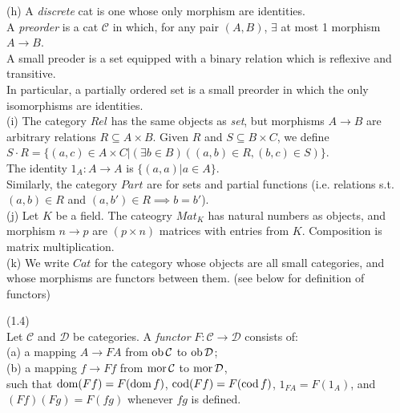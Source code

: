 \documentclass[a4paper]{article}
\begin{document}
\begin{eg}
    (h) A \emph{discrete} cat is one whose only morphism are identities.\\
    A \emph{preorder} is a cat $\mathcal{C}$ in which, for any pair $(A,B)$, $\exists$ at most 1 morphism $A \to B$.\\
    A small preoder is a set equipped with a binary relation which is reflexive and transitive.\\
    In particular, a partially ordered set is a small preorder in which the only isomorphisms are identities.\\
    (i) The category $Rel$ has the same objects as \emph{set}, but morphisms $A \to B$ are arbitrary relations $R \subseteq A \times B$. Given $R$ and $S \subseteq B\times C$, we define $S \cdot R = \{(a,c) \in A \times C | (\exists b \in B) ((a,b) \in R, (b,c) \in S)\}$.\\
    The identity $1_A:A \to A$ is $\{(a,a) | a \in A\}$.\\
    Similarly, the category $Part$ are for sets and partial functions (i.e. relations s.t. $(a,b) \in R$ and $(a,b') \in R \implies b = b'$).\\
    (j) Let $K$ be a field. The cateogry $Mat_K$ has natural numbers as objects, and morphism $n \to p$ are $(p \times n)$ matrices with entries from $K$. Composition is matrix multiplication.\\
    (k) We write $Cat$ for the category whose objects are all small categories, and whose morphisms are functors between them. (see below for definition of functors)
\end{eg}

\begin{defi} (1.4)\\
    Let $\mathcal{C}$ and $\mathcal{D}$ be categories. A \emph{functor} $F:\mathcal{C} \to \mathcal{D}$ consists of:\\
    (a) a mapping $A \to FA$ from $\operatorname{ob} \mathcal{C}$ to $\operatorname{ob} \mathcal{D}$;\\
    (b) a mapping $f \to Ff$ from $\operatorname{mor} \mathcal{C}$ to $\operatorname{mor} \mathcal{D}$,\\
    such that $\operatorname{dom}(Ff) = F(\operatorname{dom} f)$, $\operatorname{cod}(Ff) = F(\operatorname{cod} f)$, $1_{FA} = F(1_A)$, and $(Ff)(Fg) = F(fg)$ whenever $fg$ is defined.
\end{defi}
\end{document}
